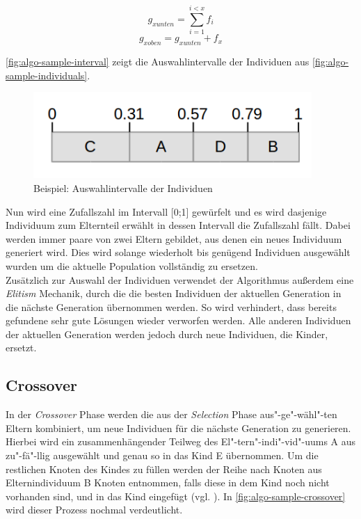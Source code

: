 \documentclass[12pt,a4paper]{scrreprt}
\newcommand{\absatz}{\\[12pt]}
\begin{document}
$$
g_{x unten} = \sum_{i=1}^{i<x} f_i
$$
$$
g_{x oben} = g_{x unten} + f_x
$$

\autoref{fig:algo-sample-interval} zeigt die Auswahlintervalle der Individuen aus \autoref{fig:algo-sample-individuals}.

\begin{figure}[ht]
  	\centering
	\includegraphics[width=300pt]{images/algo_03_interval.png}
	\caption{Beispiel: Auswahlintervalle der Individuen}
	\label{fig:algo-sample-interval}
\end{figure}

Nun wird eine Zufallszahl im Intervall [0;1] gewürfelt und es wird dasjenige Individuum zum Elternteil erwählt in dessen Intervall die Zufallszahl fällt. Dabei werden immer paare von zwei Eltern gebildet, aus denen ein neues Individuum generiert wird. Dies wird solange wiederholt bis genügend Individuen ausgewählt wurden um die aktuelle Population vollständig zu ersetzen.\absatz
Zusätzlich zur Auswahl der Individuen verwendet der Algorithmus außerdem eine \textit{Elitism} Mechanik, durch die die besten Individuen der aktuellen Generation in die nächste Generation übernommen werden. So wird verhindert, dass bereits gefundene sehr gute Lösungen wieder verworfen werden. Alle anderen Individuen der aktuellen Generation werden jedoch durch neue Individuen, die Kinder, ersetzt.

\subsection{Crossover}
\label{subsec:crossover}

In der \textit{Crossover} Phase werden die aus der \textit{Selection} Phase aus"-ge"-wähl"-ten Eltern kombiniert, um neue Individuen für die nächste Generation zu generieren.\\
Hierbei wird ein zusammenhängender Teilweg des El"-tern"-indi"-vid"-uums A aus zu"-fä"-llig ausgewählt und genau so in das Kind E übernommen. Um die restlichen Knoten des Kindes zu füllen werden der Reihe nach Knoten aus Elternindividuum B Knoten entnommen, falls diese in dem Kind noch nicht vorhanden sind, und in das Kind eingefügt (vgl. \cite{jacobsen12B}). In \autoref{fig:algo-sample-crossover} wird dieser Prozess nochmal verdeutlicht.
\pagebreak
\end{document}
